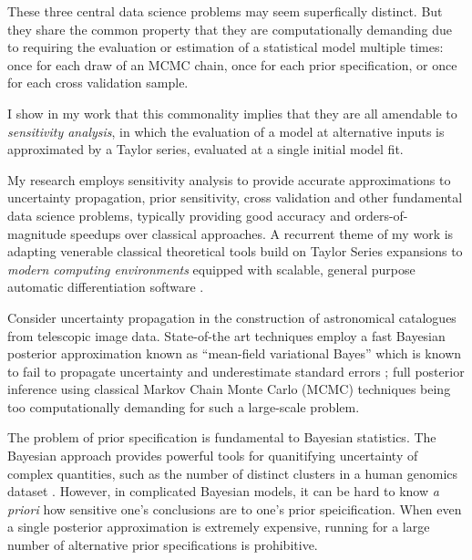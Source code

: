 These three central data science problems may seem superfically distinct.  But
they share the common property that they are computationally demanding due to
requiring the evaluation or estimation of a statistical model multiple times:
once for each draw of an MCMC chain, once for each prior specification, or once
for each cross validation sample.

I show in my work that this commonality implies that they are all amendable to
{\em sensitivity analysis}, in which the evaluation of a model at alternative
inputs is approximated by a Taylor series, evaluated at a single initial model
fit.

My research employs sensitivity analysis to provide accurate approximations to
uncertainty propagation, prior sensitivity, cross validation and other
fundamental data science problems, typically providing good accuracy and
orders-of-magnitude speedups over classical approaches.  A recurrent theme of my
work is adapting venerable classical theoretical tools build on Taylor Series
expansions  \citep{reeds:1976:thesis, gustafson:1996:localposterior,
opper:2001:advancedmeanfield} to {\em modern computing environments} equipped
with scalable, general purpose automatic differentiation software
\citep{baydin:2015:automatic, carpenter:2015:stanmath}.





\newpage

Consider uncertainty propagation in the construction of astronomical catalogues
from telescopic image data. State-of-the art techniques employ a fast Bayesian
posterior approximation known as ``mean-field variational Bayes''
\citep{regier:2019:cataloging} which is known to fail to propagate uncertainty
and underestimate standard errors \citep{turner:2011:two}; full posterior
inference using classical Markov Chain Monte Carlo (MCMC) techniques being too
computationally demanding for such a large-scale problem.

The problem of prior specification is fundamental to Bayesian statistics. The
Bayesian approach provides powerful tools for quanitifying uncertainty of
complex quantities, such as the number of distinct clusters in a human genomics
dataset \citep{huang:2011:haplotype, raj:2014:faststructure}.  However, in
complicated Bayesian models, it can be hard to know {\em a priori} how sensitive
one's conclusions are to one's prior speicification.  When even a single
posterior approximation is extremely expensive, running for a large number of
alternative prior specifications is prohibitive.


